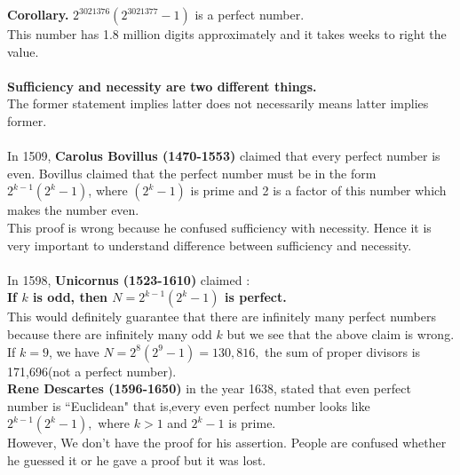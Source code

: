 \documentclass[a4paper,reqno,11pt]{book}
\theoremstyle{plain}%
\theoremstyle{definition}
\begin{document}
\noindent \textbf{Corollary.} $ 2^
{3021376}(2^{3021377} - 1)$ is a perfect number.\\
This number has 1.8 million digits approximately and it takes weeks to  right the value.\\
\\
\noindent \textbf{Sufficiency and necessity are two different things.}\\The former statement implies latter does not necessarily means latter implies former. \\
\\
\noindent In 1509, \textbf{Carolus Bovillus (1470-1553)} claimed that every perfect number is even.\cite{ref 2} 
Bovillus claimed that the perfect number must be in the form $2^
{k- 1 }(2^k - 1 )$, 
where $(2^k - 1)$ is prime and 2 is a factor of this number which makes the number even.\\
This proof is wrong because he confused sufficiency with necessity. Hence it is very important to understand difference between sufficiency and necessity.\\
\\
In 1598,  \textbf{Unicornus (1523-1610)} claimed :
\\
\noindent \textbf{ If $k$ is odd, then $ N = 2^
{k-1 }(2^k - 1) $ is perfect.} \\
This would definitely guarantee that there are infinitely many perfect numbers because
 there are infinitely many odd $k$ but we see that the above claim is wrong.\\ If $k = 9$, we have 
$N = 2^
8
(2^9 - 1) = 130,816,$ the sum of proper divisors is 171,696(not a perfect number).
\\
\textbf{Rene Descartes 
(1596-1650)} in the year 1638, stated that
even perfect number is ``Euclidean" that is,every even perfect number looks 
like $ 2^
{k-1}
(2^k - 1 ),$ where $ k > 1$ and $2^k-1$ is prime.\\
However, We don't have the proof for his assertion. People are confused whether he guessed it or he gave a proof but it was lost.\\
\end{document}
